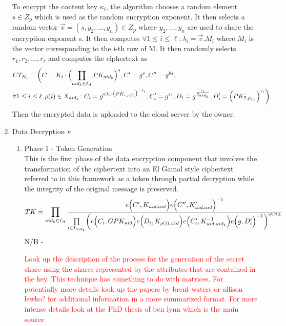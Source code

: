 \begin{enumerate}
	To encrypt the content key $\kappa_{i}$, the algorithm chooses a random element $ s \in Z_{p} $ which is used as the random encryption exponent. It then selects a random vector $ \vec{v} = (s, y_{2},\ldots,y_{n}) \in Z_{p} $ where $ y_{2},\ldots,y_{n} $ are used to share the encryption exponent s. It then computes $ \forall 1 \leq i \leq \ell: \lambda_{i} = \vec{v}.M_{i} $ where $ M_{i} $ is the vector corresponding to the i-th row of M. It then randomly selects $ r_{1},r_{2},\ldots,r_{\ell} $ and computes the ciphertext as	
	\begin{align*}
		&CT_{K_{i}} = \biggl(C = K_{i}\cdot\Bigl(\prod\limits_{aid_{k} \in I_{A}}PK_{aid_{k}}\Bigl)^{s}, C' = g^{s}, C'' = g^{bs},\\
		&\forall 1 \leq i \leq \ell, \rho(i) \in X_{aid_{k}} \colon C_{i} = g^{a\lambda_{i}\cdot\bigl(PK_{i,\rho(i)}\bigl)^{-r_{i}}}, C'_{i} = g^{r_{i}},D_{i} = g^{\frac{r_{i}}{\beta_{aid_k}}}, D'_{i} = \Bigl(PK_{2,\rho_{(i)}}\Bigl)^{r_{i}}\biggl)
	\end{align*}
	Then the encrypted data is uploaded to the cloud server by the owner.
	
	\item Data Decryption
	$\kappa$
	\begin{enumerate}
		
		\item Phase 1 - Token Generation\\
		This is the first phase of the data encryption component that involves the transformation of the ciphertext into an El Gamal style ciphertext referred to in this framework as a token through partial decryption while the integrity of the original message is preserved.
		\begin{align*}
			TK = \prod\limits_{aid_{k} \in I_{A}} \frac{e\Bigl(C', K_{uid,aid}\Bigl)e\Bigl(C'', K'_{uid,aid}\Bigl)^{-1}}{\prod\limits_{i \in I_{aid_k}}\biggl(e\Bigl(C_i, GPK_{uid}\Bigl)e\Bigl(D_i, K_{\rho(i),uid}\Bigl)e\Bigl(C'_i, K_{uid,aid_k}^{-1}\Bigl)e\Bigl(g, D'_i\Bigl)^{-1}\biggl)^{\omega_{i}n_A}}
		\end{align*}
		N/B - 
		
		\textcolor{red}{Look up the description of the process for the generation of the secret share using the shares represented by the attributes that are contained in the key. This technique has something to do with matrices. For potentially more details look up the papers by brent waters or allison lewko? for additional information in a more summarized format. For more intense details look at the PhD thesis of ben lynn which is the main source}
		

\end{enumerate}
\end{enumerate}
